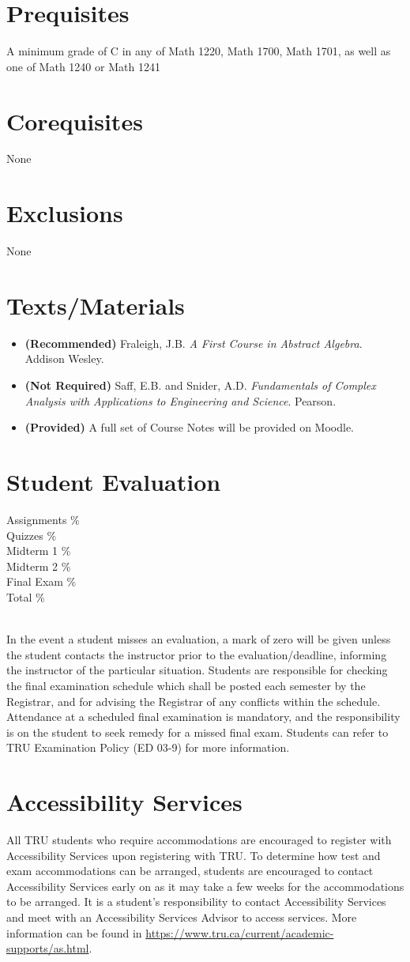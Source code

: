 \documentclass[10pt]{trumathoutline}
\newcommand{\courseprerequisites}{
A minimum grade of C in any of Math 1220, Math 1700, Math 1701, as well as one of Math 1240 or Math 1241}
\newcommand{\coursecorequisites}{None}
\newcommand{\courseexclusions}{None}
\newcommand{\textsmaterials}{
\begin{itemize}
\item \textbf{(Recommended)} Fraleigh, J.B. \emph{A First Course in Abstract Algebra}. Addison Wesley.
\item \textbf{(Not Required)} Saff, E.B. and Snider, A.D. \emph{Fundamentals of Complex Analysis with Applications to Engineering and Science}. Pearson.
\item \textbf{(Provided)} A full set of Course Notes will be provided on Moodle.
\end{itemize}
}
\newcommand{\evaluation}{
	Assignments \dotfill	20\%\\
	Quizzes \dotfill 		15\%\\
	Midterm 1	\dotfill	15\%\\
	Midterm 2	\dotfill 	15\%\\
	Final Exam \dotfill	35\%\\
	Total	\dotfill 		100\%
}
\begin{document}
\section*{Prequisites}
\courseprerequisites

\section*{Corequisites}
\coursecorequisites

\section*{Exclusions}
\courseexclusions

\section*{Texts/Materials}
\textsmaterials

\section*{Student Evaluation}
\begin{minipage}{\textwidth}
\evaluation
\end{minipage}\\


In the event a student misses an evaluation, a mark of zero will be given unless the student contacts the instructor prior to the evaluation/deadline, informing the instructor of the particular situation. Students are responsible for checking the final examination schedule which shall be posted each semester by the Registrar, and for advising the Registrar of any conflicts within the schedule. Attendance at a scheduled final examination is mandatory, and the responsibility is on the student to seek remedy for a missed final exam. Students can refer to TRU Examination Policy (ED 03-9) for more information.


\section*{Accessibility Services}
All TRU students who require accommodations are encouraged to register with Accessibility Services upon registering with TRU. To determine how test and exam accommodations can be arranged, students are encouraged to contact Accessibility Services early on as it may take a few weeks for the accommodations to be arranged. It is a student's responsibility to contact Accessibility Services and meet with an Accessibility Services Advisor to access services. More information can be found in
\href{https://www.tru.ca/current/academic-supports/as.html}{https://www.tru.ca/current/academic-supports/as.html}.
\end{document}
